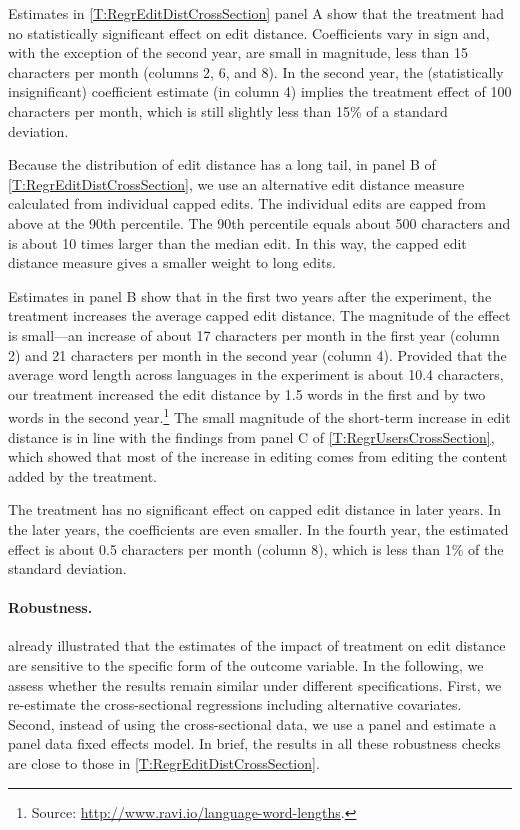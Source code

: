 \documentclass[12pt]{article}
\begin{document}
Estimates in \cref{T:RegrEditDistCrossSection} panel A show that the treatment had no statistically significant effect on edit distance. Coefficients vary in sign and, with the exception of the second year,  are small in magnitude, less than 15 characters per month (columns 2, 6, and 8). In the second year, the (statistically insignificant) coefficient estimate (in column 4) implies the treatment effect of 100 characters per month, which is still slightly less than 15\% of a standard deviation.  

Because the distribution of edit distance has a long tail, in panel B of \cref{T:RegrEditDistCrossSection}, we use an alternative edit distance measure calculated from individual capped edits. The individual edits are capped from above at the 90th percentile. The 90th percentile equals about 500 characters and is about 10 times larger than the median edit. In this way, the capped edit distance measure gives a smaller weight to long edits. 

Estimates in panel B show that in the first two years after the experiment, the treatment increases the average capped edit distance. The magnitude of the effect is small---an increase of about 17 characters per month in the first year (column 2) and 21 characters per month in the second year (column 4). Provided that the average word length across languages in the experiment is about 10.4 characters, our treatment increased the edit distance by 1.5 words in the first and by two words in the second year.\footnote{Source: \url{http://www.ravi.io/language-word-lengths}.} The small magnitude of the short-term increase in edit distance is in line with the findings from panel C of \cref{T:RegrUsersCrossSection}, which showed that most of the increase in editing comes from editing the content added by the treatment.

The treatment has no significant effect on capped edit distance in later years. In the later years, the coefficients are even smaller. In the fourth year, the estimated effect is about 0.5 characters per month (column 8), which is less than 1\% of the standard deviation. 


\paragraph{Robustness.}
 already illustrated that the estimates of the impact of treatment on edit distance are sensitive to the specific form of the outcome variable. In the following, we assess whether the results remain similar under different specifications. First, we re-estimate the cross-sectional regressions including alternative covariates. Second, instead of using the cross-sectional data, we use a panel and estimate a panel data fixed effects model. In brief, the results in all these robustness checks are close to those in \cref{T:RegrEditDistCrossSection}. 
\end{document}
